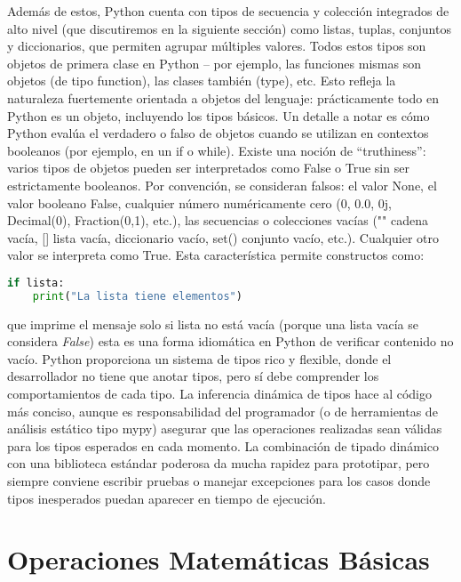 Además de estos, Python cuenta con tipos de secuencia y colección integrados de alto nivel (que discutiremos en la siguiente sección) como listas, tuplas, conjuntos y diccionarios, que permiten agrupar múltiples valores. Todos estos tipos son objetos de primera clase en Python – por ejemplo, las funciones mismas son objetos (de tipo function), las clases también (type), etc. Esto refleja la naturaleza fuertemente orientada a objetos del lenguaje: prácticamente todo en Python es un objeto, incluyendo los tipos básicos.
Un detalle a notar es cómo Python evalúa el verdadero o falso de objetos cuando se utilizan en contextos booleanos (por ejemplo, en un if o while). Existe una noción de “truthiness”: varios tipos de objetos pueden ser interpretados como False o True sin ser estrictamente booleanos. Por convención, se consideran falsos: el valor None, el valor booleano False, cualquier número numéricamente cero (0, 0.0, 0j, Decimal(0), Fraction(0,1), etc.), las secuencias o colecciones vacías ("" cadena vacía, [] lista vacía, {} diccionario vacío, set() conjunto vacío, etc.). Cualquier otro valor se interpreta como True. Esta característica permite constructos como:

\begin{lstlisting}[language=Python, caption={Ejemplos de constructos en Python.}]
if lista: 
    print("La lista tiene elementos")
\end{lstlisting}

que imprime el mensaje solo si lista no está vacía (porque una lista vacía se considera \textit{False}) esta es una forma idiomática en Python de verificar contenido no vacío. 
Python proporciona un sistema de tipos rico y flexible, donde el desarrollador no tiene que anotar tipos, pero sí debe comprender los comportamientos de cada tipo. 
La inferencia dinámica de tipos hace al código más conciso, aunque es responsabilidad del programador (o de herramientas de análisis estático tipo mypy) asegurar 
que las operaciones realizadas sean válidas para los tipos esperados en cada momento. La combinación de tipado dinámico con una biblioteca estándar poderosa da mucha 
rapidez para prototipar, pero siempre conviene escribir pruebas o manejar excepciones para los casos donde tipos inesperados puedan aparecer en tiempo de ejecución.

\section{Operaciones Matemáticas Básicas}

